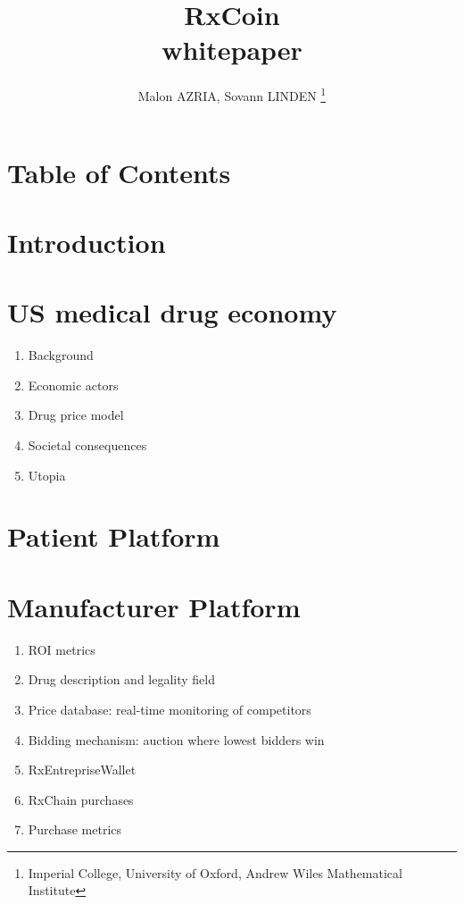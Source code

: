 \documentclass[a4paper,11pt]{article}
\title{RxCoin\\\Large{whitepaper}\\}
\author{Malon AZRIA, Sovann LINDEN \thanks{Imperial College, University of Oxford, Andrew Wiles Mathematical Institute}}
\begin{document}
   \maketitle


\section{Table of Contents}
   
   
\section{Introduction}
   

\section{US medical drug economy }   
   \begin{enumerate}
     \item Background
     \item Economic actors
     \item Drug price model
     \item Societal consequences
     \item Utopia
   \end{enumerate}
   
\section{Patient Platform}
   

\section{Manufacturer Platform}
   \begin{enumerate}
     \item ROI metrics
     \item Drug description and legality field
     \item Price database: real-time monitoring of competitors
     \item Bidding mechanism: auction where lowest bidders win
     \item RxEntrepriseWallet
     \item RxChain purchases
     \item Purchase metrics
   \end{enumerate}
   
\end{document}
